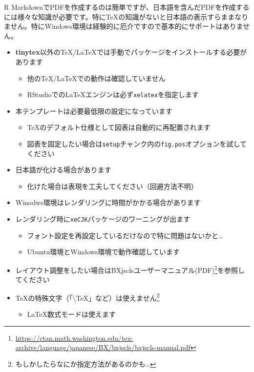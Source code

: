 \documentclass[
  12pt,
  a4paper,xelatex,ja=standard]{bxjsarticle}
\DeclareRobustCommand{\href}[2]{#2\footnote{\url{#1}}}
\providecommand{\tightlist}{%
  \setlength{\itemsep}{0pt}\setlength{\parskip}{0pt}}
\begin{document}
R
MarkdownでPDFを作成するのは簡単ですが、日本語を含んだPDFを作成するには様々な知識が必要です。特にTeXの知識がないと日本語の表示すらままなりません。特にWindows環境は経験的に厄介ですので基本的にサポートはありません。

\begin{itemize}
\tightlist
\item
  \textbf{tinytex}以外のTeX/LaTeXでは手動でパッケージをインストールする必要があります

  \begin{itemize}
  \tightlist
  \item
    他のTeX/LaTeXでの動作は確認していません
  \item
    RStudioでのLaTeXエンジンは必ず\texttt{xelatex}を指定します
  \end{itemize}
\item
  本テンプレートは必要最低限の設定になっています

  \begin{itemize}
  \tightlist
  \item
    TeXのデフォルト仕様として図表は自動的に再配置されます
  \item
    図表を固定したい場合は\texttt{setup}チャンク内の\texttt{fig.pos}オプションを試してください
  \end{itemize}
\item
  日本語が化ける場合があります

  \begin{itemize}
  \tightlist
  \item
    化けた場合は表現を工夫してください（回避方法不明）
  \end{itemize}
\item
  Winodws環境はレンダリングに時間がかかる場合があります
\item
  レンダリング時に\texttt{xeCJK}パッケージのワーニングが出ます

  \begin{itemize}
  \tightlist
  \item
    フォント設定を再設定しているだけなので特に問題はないかと\ldots{}
  \item
    Ubuntu環境とWindows環境で動作確認しています
  \end{itemize}
\item
  レイアウト調整をしたい場合は\href{https://ctan.math.washington.edu/tex-archive/language/japanese/BX/bxjscls/bxjscls-manual.pdf}{BXjsclsユーザーマニュアル(PDF)}を参照してください
\item
  TeXの特殊文字（「\textbackslash TeX」など）は使えません\footnote{もしかしたらなにか指定方法があるのかも\ldots{}}

  \begin{itemize}
  \tightlist
  \item
    LaTeX数式モードは使えます
  \end{itemize}
\end{itemize}
\end{document}
